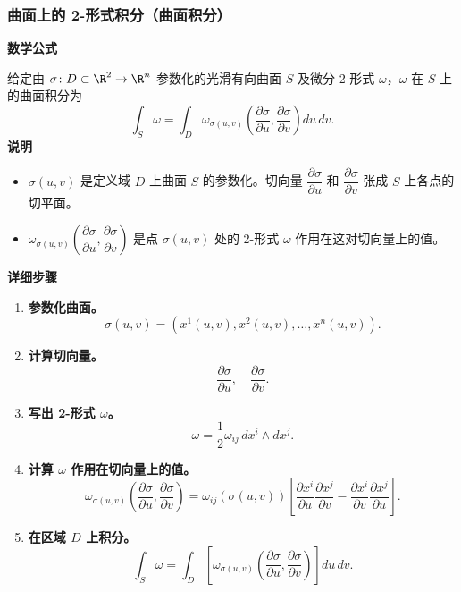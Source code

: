 \subsubsection{曲面上的 2-形式积分（曲面积分）}
\noindent\textbf{数学公式}\par
给定由 $\sigma\colon D\subset\R^2\to\R^n$ 参数化的光滑有向曲面 $S$ 及微分 2-形式 $\omega$，$\omega$ 在 $S$ 上的曲面积分为
\[
  \int_S\omega=\int_D\omega_{\sigma(u,v)}
  \left(\frac{\partial\sigma}{\partial u},\frac{\partial\sigma}{\partial v}\right)du\,dv.
\]
\noindent\textbf{说明}
\begin{itemize}
\item $\sigma(u,v)$ 是定义域 $D$ 上曲面 $S$ 的参数化。切向量 $\dfrac{\partial\sigma}{\partial u}$ 和 $\dfrac{\partial\sigma}{\partial v}$ 张成 $S$ 上各点的切平面。
\item $\omega_{\sigma(u,v)}\left(\dfrac{\partial\sigma}{\partial u},\dfrac{\partial\sigma}{\partial v}\right)$ 是点 $\sigma(u,v)$ 处的 2-形式 $\omega$ 作用在这对切向量上的值。
\end{itemize}

\noindent\textbf{详细步骤}
\begin{enumerate}
\item \textbf{参数化曲面。}
\[
  \sigma(u,v)=(x^1(u,v),x^2(u,v),\dots,x^n(u,v)).
\]
\item \textbf{计算切向量。}
\[
  \frac{\partial\sigma}{\partial u},\quad \frac{\partial\sigma}{\partial v}.
\]
\item \textbf{写出 2-形式 $\omega$。}
\[
  \omega=\frac12\omega_{ij}\,dx^i\wedge dx^j.
\]
\item \textbf{计算 $\omega$ 作用在切向量上的值。}%
%
\[
  \omega_{\sigma(u,v)}
  \left(\frac{\partial\sigma}{\partial u},\frac{\partial\sigma}{\partial v}\right)
  =\omega_{ij}(\sigma(u,v))
  \left[\frac{\partial x^i}{\partial u}\frac{\partial x^j}{\partial v}
       -\frac{\partial x^i}{\partial v}\frac{\partial x^j}{\partial u}\right].
\]
\item \textbf{在区域 $D$ 上积分。}
\[
  \int_S\omega=\int_D\left[\omega_{\sigma(u,v)}
  \left(\frac{\partial\sigma}{\partial u},\frac{\partial\sigma}{\partial v}\right)\right]du\,dv.
\]
\end{enumerate}

